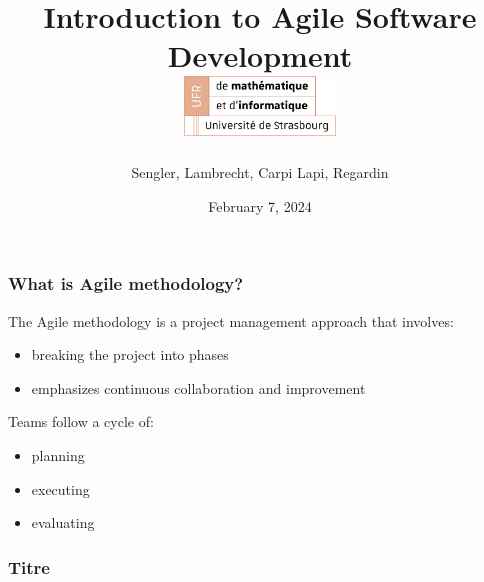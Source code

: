 \documentclass[10pt]{beamer}
\title[Introduction to Agile Software Development]{
  Introduction to Agile Software Development \\
  \vspace{1cm}
  \includegraphics[width=4cm]{logo_ufr.png}
}
\author[SuperAgile]{Sengler, Lambrecht, Carpi Lapi, Regardin}
\date[February 7, 2024]{February 7, 2024}
\begin{document}
\frame{\titlepage}


\begin{frame}
\frametitle{What is Agile methodology?}
The Agile methodology is a project management approach that involves:
\begin{itemize}
    \item breaking the project into phases
    \item emphasizes continuous collaboration and improvement \\
    \vspace{1cm}
\end{itemize}

Teams follow a cycle of: 
\begin{itemize}
    \item planning
    \item executing
    \item evaluating
\end{itemize}

\end{frame}

\begin{frame}
  \frametitle{Titre}
    
\end{frame}

\begin{frame}
    
\end{frame}
\end{document}
